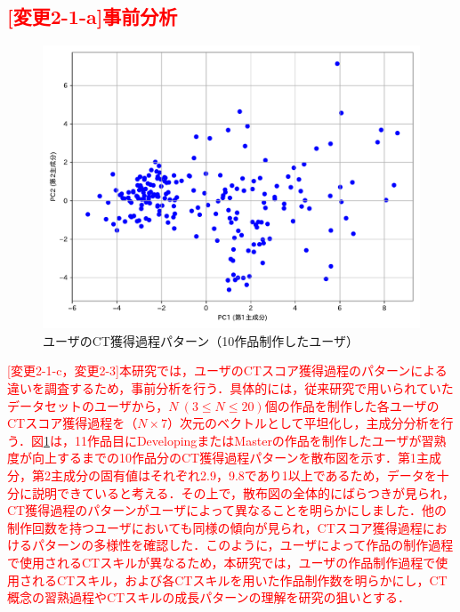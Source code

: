 \documentclass[submit]{ipsj}
\begin{document}
\subsection{\textcolor{red}{[変更2-1-a]事前分析}}\label{sec:relate-2}

\begin{figure}[t]
	\centering
	\includegraphics[width=1.0\linewidth]{Okamoto_fig/pca-10.pdf}
	\caption{ユーザのCT獲得過程パターン（10作品制作したユーザ）}
	\label{fig:pca}
 \vspace{-2mm}
\end{figure}

\textcolor{red}{
[変更2-1-c，変更2-3]本研究では，ユーザのCTスコア獲得過程のパターンによる違いを調査するため，事前分析を行う．具体的には，従来研究\cite{Ando_2021}で用いられていたデータセットのユーザから，{$N~(3 \leq N \leq 20)$}個の作品を制作した各ユーザのCTスコア獲得過程を（$N \times 7$）次元のベクトルとして平坦化し，主成分分析を行う．図\ref{fig:pca}は，11作品目にDevelopingまたはMasterの作品を制作したユーザが習熟度が向上するまでの10作品分のCT獲得過程パターンを散布図を示す．第1主成分，第2主成分の固有値はそれぞれ2.9，9.8であり1以上であるため，データを十分に説明できていると考える．その上で，散布図の全体的にばらつきが見られ，CT獲得過程のパターンがユーザによって異なることを明らかにしました．他の制作回数を持つユーザにおいても同様の傾向が見られ，CTスコア獲得過程におけるパターンの多様性を確認した．このように，ユーザによって作品の制作過程で使用されるCTスキルが異なるため，本研究では，ユーザの作品制作過程で使用されるCTスキル，および各CTスキルを用いた作品制作数を明らかにし，CT概念の習熟過程やCTスキルの成長パターンの理解を研究の狙いとする．
}
\end{document}
